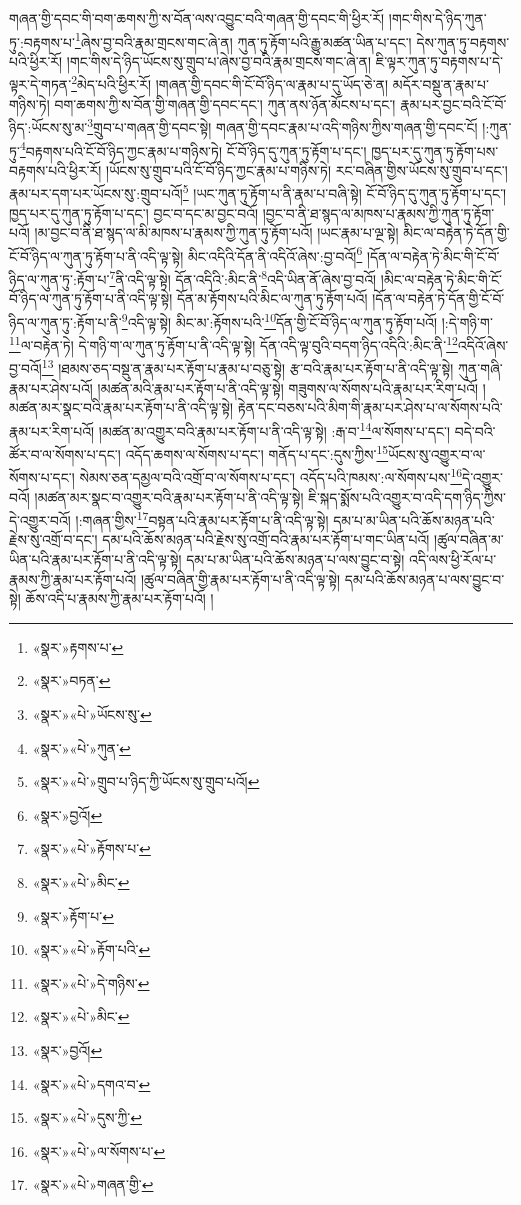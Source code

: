 གཞན་གྱི་དབང་གི་བག་ཆགས་ཀྱི་ས་བོན་ལས་འབྱུང་བའི་གཞན་གྱི་དབང་གི་ཕྱིར་རོ། །གང་གིས་དེ་ཉིད་ཀུན་ཏུ་:བརྟགས་པ་\footnote{«སྣར་»རྟགས་པ་}ཞེས་བྱ་བའི་རྣམ་གྲངས་གང་ཞེ་ན། ཀུན་ཏུ་རྟོག་པའི་རྒྱུ་མཚན་ཡིན་པ་དང་། དེས་ཀུན་ཏུ་བརྟགས་པའི་ཕྱིར་རོ། །གང་གིས་དེ་ཉིད་ཡོངས་སུ་གྲུབ་པ་ཞེས་བྱ་བའི་རྣམ་གྲངས་གང་ཞེ་ན། ཇི་ལྟར་ཀུན་ཏུ་བརྟགས་པ་དེ་ལྟར་དེ་གཏན་\footnote{«སྣར་»བཏན་}མེད་པའི་ཕྱིར་རོ། །གཞན་གྱི་དབང་གི་ངོ་བོ་ཉིད་ལ་རྣམ་པ་དུ་ཡོད་ཅེ་ན། མདོར་བསྡུ་ན་རྣམ་པ་གཉིས་ཏེ། བག་ཆགས་ཀྱི་ས་བོན་གྱི་གཞན་གྱི་དབང་དང་། ཀུན་ནས་ཉོན་མོངས་པ་དང་། རྣམ་པར་བྱང་བའི་ངོ་བོ་ཉིད་:ཡོངས་སུ་མ་\footnote{«སྣར་»«པེ་»ཡོངས་སུ་}གྲུབ་པ་གཞན་གྱི་དབང་སྟེ། གཞན་གྱི་དབང་རྣམ་པ་འདི་གཉིས་ཀྱིས་གཞན་གྱི་དབང་ངོ། །:ཀུན་ཏུ་\footnote{«སྣར་»«པེ་»ཀུན་}བརྟགས་པའི་ངོ་བོ་ཉིད་ཀྱང་རྣམ་པ་གཉིས་ཏེ། ངོ་བོ་ཉིད་དུ་ཀུན་ཏུ་རྟོག་པ་དང་། ཁྱད་པར་དུ་ཀུན་ཏུ་རྟོག་པས་བརྟགས་པའི་ཕྱིར་རོ། །ཡོངས་སུ་གྲུབ་པའི་ངོ་བོ་ཉིད་ཀྱང་རྣམ་པ་གཉིས་ཏེ། རང་བཞིན་གྱིས་ཡོངས་སུ་གྲུབ་པ་དང་། རྣམ་པར་དག་པར་ཡོངས་སུ་:གྲུབ་པའོ།\footnote{«སྣར་»«པེ་»གྲུབ་པ་ཉིད་ཀྱི་ཡོངས་སུ་གྲུབ་པའོ།} །ཡང་ཀུན་ཏུ་རྟོག་པ་ནི་རྣམ་པ་བཞི་སྟེ། ངོ་བོ་ཉིད་དུ་ཀུན་ཏུ་རྟོག་པ་དང་། ཁྱད་པར་དུ་ཀུན་ཏུ་རྟོག་པ་དང་། བྱང་བ་དང་མ་བྱང་བའོ། །བྱང་བ་ནི་ཐ་སྙད་ལ་མཁས་པ་རྣམས་ཀྱི་ཀུན་ཏུ་རྟོག་པའོ། །མ་བྱང་བ་ནི་ཐ་སྙད་ལ་མི་མཁས་པ་རྣམས་ཀྱི་ཀུན་ཏུ་རྟོག་པའོ། །ཡང་རྣམ་པ་ལྔ་སྟེ། མིང་ལ་བརྟེན་ཏེ་དོན་གྱི་ངོ་བོ་ཉིད་ལ་ཀུན་ཏུ་རྟོག་པ་ནི་འདི་ལྟ་སྟེ། མིང་འདིའི་དོན་ནི་འདིའོ་ཞེས་:བྱ་བའོ།\footnote{«སྣར་»བྱའོ།} །དོན་ལ་བརྟེན་ཏེ་མིང་གི་ངོ་བོ་ཉིད་ལ་ཀུན་ཏུ་:རྟོག་པ་\footnote{«སྣར་»«པེ་»རྟོགས་པ་}ནི་འདི་ལྟ་སྟེ། དོན་འདིའི་:མིང་ནི་\footnote{«སྣར་»«པེ་»མིང་}འདི་ཡིན་ནོ་ཞེས་བྱ་བའོ། །མིང་ལ་བརྟེན་ཏེ་མིང་གི་ངོ་བོ་ཉིད་ལ་ཀུན་ཏུ་རྟོག་པ་ནི་འདི་ལྟ་སྟེ། དོན་མ་རྟོགས་པའི་མིང་ལ་ཀུན་ཏུ་རྟོག་པའོ། །དོན་ལ་བརྟེན་ཏེ་དོན་གྱི་ངོ་བོ་ཉིད་ལ་ཀུན་ཏུ་:རྟོག་པ་ནི་\footnote{«སྣར་»རྟོག་པ་}འདི་ལྟ་སྟེ། མིང་མ་:རྟོགས་པའི་\footnote{«སྣར་»«པེ་»རྟོག་པའི་}དོན་གྱི་ངོ་བོ་ཉིད་ལ་ཀུན་ཏུ་རྟོག་པའོ། །:དེ་གཉི་ག་\footnote{«སྣར་»«པེ་»དེ་གཉིས་}ལ་བརྟེན་ཏེ། དེ་གཉི་ག་ལ་ཀུན་ཏུ་རྟོག་པ་ནི་འདི་ལྟ་སྟེ། དོན་འདི་ལྟ་བུའི་བདག་ཉིད་འདིའི་:མིང་ནི་\footnote{«སྣར་»«པེ་»མིང་}འདིའོ་ཞེས་བྱ་བའོ།\footnote{«སྣར་»བྱའོ།} །ཐམས་ཅད་བསྡུ་ན་རྣམ་པར་རྟོག་པ་རྣམ་པ་བཅུ་སྟེ། རྩ་བའི་རྣམ་པར་རྟོག་པ་ནི་འདི་ལྟ་སྟེ། ཀུན་གཞི་རྣམ་པར་ཤེས་པའོ། །མཚན་མའི་རྣམ་པར་རྟོག་པ་ནི་འདི་ལྟ་སྟེ། གཟུགས་ལ་སོགས་པའི་རྣམ་པར་རིག་པའོ། །མཚན་མར་སྣང་བའི་རྣམ་པར་རྟོག་པ་ནི་འདི་ལྟ་སྟེ། རྟེན་དང་བཅས་པའི་མིག་གི་རྣམ་པར་ཤེས་པ་ལ་སོགས་པའི་རྣམ་པར་རིག་པའོ། །མཚན་མ་འགྱུར་བའི་རྣམ་པར་རྟོག་པ་ནི་འདི་ལྟ་སྟེ། :རྒ་བ་\footnote{«སྣར་»«པེ་»དགའ་བ་}ལ་སོགས་པ་དང་། བདེ་བའི་ཚོར་བ་ལ་སོགས་པ་དང་། འདོད་ཆགས་ལ་སོགས་པ་དང་། གནོད་པ་དང་:དུས་ཀྱིས་\footnote{«སྣར་»«པེ་»དུས་ཀྱི་}ཡོངས་སུ་འགྱུར་བ་ལ་སོགས་པ་དང་། སེམས་ཅན་དམྱལ་བའི་འགྲོ་བ་ལ་སོགས་པ་དང་། འདོད་པའི་ཁམས་:ལ་སོགས་པས་\footnote{«སྣར་»«པེ་»ལ་སོགས་པ་}དེ་འགྱུར་བའོ། །མཚན་མར་སྣང་བ་འགྱུར་བའི་རྣམ་པར་རྟོག་པ་ནི་འདི་ལྟ་སྟེ། ཇི་སྐད་སྨོས་པའི་འགྱུར་བ་འདི་དག་ཉིད་ཀྱིས་དེ་འགྱུར་བའོ། །:གཞན་གྱིས་\footnote{«སྣར་»«པེ་»གཞན་གྱི་}བསྟན་པའི་རྣམ་པར་རྟོག་པ་ནི་འདི་ལྟ་སྟེ། དམ་པ་མ་ཡིན་པའི་ཆོས་མཉན་པའི་རྗེས་སུ་འགྲོ་བ་དང་། དམ་པའི་ཆོས་མཉན་པའི་རྗེས་སུ་འགྲོ་བའི་རྣམ་པར་རྟོག་པ་གང་ཡིན་པའོ། །ཚུལ་བཞིན་མ་ཡིན་པའི་རྣམ་པར་རྟོག་པ་ནི་འདི་ལྟ་སྟེ། དམ་པ་མ་ཡིན་པའི་ཆོས་མཉན་པ་ལས་བྱུང་བ་སྟེ། འདི་ལས་ཕྱི་རོལ་པ་རྣམས་ཀྱི་རྣམ་པར་རྟོག་པའོ། །ཚུལ་བཞིན་གྱི་རྣམ་པར་རྟོག་པ་ནི་འདི་ལྟ་སྟེ། དམ་པའི་ཆོས་མཉན་པ་ལས་བྱུང་བ་སྟེ། ཆོས་འདི་པ་རྣམས་ཀྱི་རྣམ་པར་རྟོག་པའོ། །
